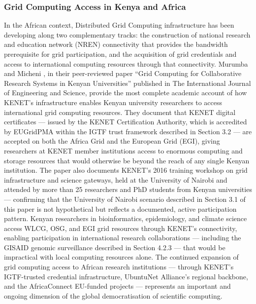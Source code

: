 \documentclass[12pt,a4paper]{report}
\begin{document}
\subsubsection{Grid Computing Access in Kenya and Africa}
In the African context, Distributed Grid Computing infrastructure has been developing along two complementary tracks: the construction of national 
research and education network (NREN) connectivity that provides the bandwidth prerequisite for grid participation, and the acquisition of grid 
credentials and access to international computing resources through that connectivity. Murumba and Micheni \parencite{murumba2017kenyan}, in their peer-reviewed paper 
“Grid Computing for Collaborative Research Systems in Kenyan Universities” published in The International Journal of Engineering and Science, 
provide the most complete academic account of how KENET’s infrastructure enables Kenyan university researchers to access international grid 
computing resources. They document that KENET digital certificates — issued by the KENET Certification Authority, which is accredited by 
EUGridPMA within the IGTF trust framework described in Section 3.2 — are accepted on both the Africa Grid and the European Grid (EGI), 
giving researchers at KENET member institutions access to enormous computing and storage resources that would otherwise be beyond the 
reach of any single Kenyan institution. The paper also documents KENET’s 2016 training workshop on grid infrastructure and science gateways,
 held at the University of Nairobi and attended by more than 25 researchers and PhD students from Kenyan universities — confirming that the 
 University of Nairobi scenario described in Section 3.1 of this paper is not hypothetical but reflects a documented, active participation pattern.
  Kenyan researchers in bioinformatics, epidemiology, and climate science access WLCG, OSG, and EGI grid resources through KENET’s connectivity,
   enabling participation in international research collaborations — including the GISAID genomic surveillance described in Section 4.2.3 — that 
   would be impractical with local computing resources alone. The continued expansion of grid computing access to African research 
   institutions — through KENET’s IGTF-trusted credential infrastructure, UbuntuNet Alliance’s regional backbone, and the AfricaConnect
    EU-funded projects — represents an important and ongoing dimension of the global democratisation of scientific computing.
\end{document}
